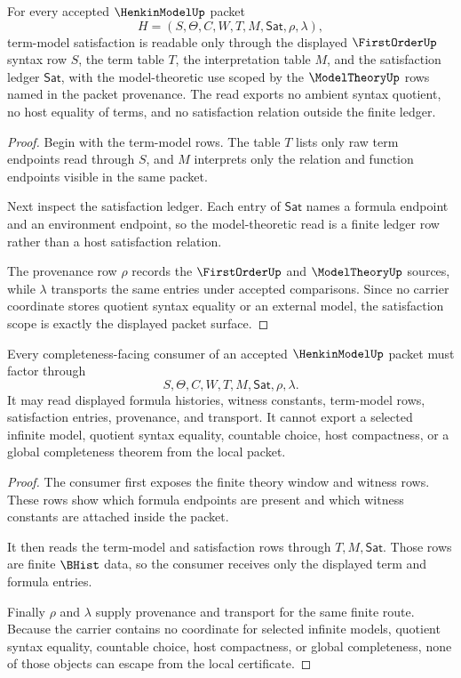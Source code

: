 \begin{theorem}
\label{thm:henkin-model-term-model-satisfaction-scope}
For every accepted $\HenkinModelUp$ packet
$$
H=(S,\Theta,C,W,T,M,\mathsf{Sat},\rho,\lambda),
$$
term-model satisfaction is readable only through the displayed $\FirstOrderUp$ syntax row $S$, the term table $T$, the interpretation table $M$, and the satisfaction ledger $\mathsf{Sat}$, with the model-theoretic use scoped by the $\ModelTheoryUp$ rows named in the packet provenance. The read exports no ambient syntax quotient, no host equality of terms, and no satisfaction relation outside the finite ledger.
\end{theorem}
\begin{proof}
Begin with the term-model rows. The table $T$ lists only raw term endpoints read through $S$, and $M$ interprets only the relation and function endpoints visible in the same packet.

Next inspect the satisfaction ledger. Each entry of $\mathsf{Sat}$ names a formula endpoint and an environment endpoint, so the model-theoretic read is a finite ledger row rather than a host satisfaction relation.

The provenance row $\rho$ records the $\FirstOrderUp$ and $\ModelTheoryUp$ sources, while $\lambda$ transports the same entries under accepted comparisons. Since no carrier coordinate stores quotient syntax equality or an external model, the satisfaction scope is exactly the displayed packet surface.
\end{proof}

\begin{theorem}
\label{thm:henkin-model-completeness-nonescape}
Every completeness-facing consumer of an accepted $\HenkinModelUp$ packet must factor through
$$
S,\Theta,C,W,T,M,\mathsf{Sat},\rho,\lambda .
$$
It may read displayed formula histories, witness constants, term-model rows, satisfaction entries, provenance, and transport. It cannot export a selected infinite model, quotient syntax equality, countable choice, host compactness, or a global completeness theorem from the local packet.
\end{theorem}
\begin{proof}
The consumer first exposes the finite theory window and witness rows. These rows show which formula endpoints are present and which witness constants are attached inside the packet.

It then reads the term-model and satisfaction rows through $T,M,\mathsf{Sat}$. Those rows are finite $\BHist$ data, so the consumer receives only the displayed term and formula entries.

Finally $\rho$ and $\lambda$ supply provenance and transport for the same finite route. Because the carrier contains no coordinate for selected infinite models, quotient syntax equality, countable choice, host compactness, or global completeness, none of those objects can escape from the local certificate.
\end{proof}

